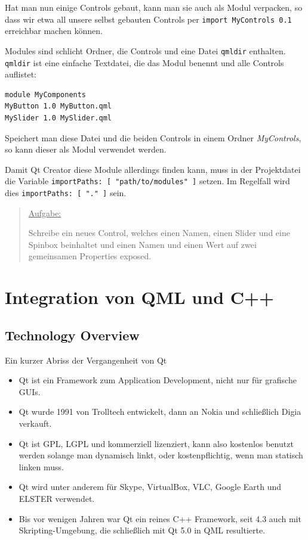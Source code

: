 \documentclass[a4paper]{article}
\begin{document}
Hat man nun einige Controls gebaut, kann man sie auch als Modul verpacken, so dass wir etwa all unsere selbst gebauten Controls per \verb~import MyControls 0.1~ erreichbar machen können.

Modules sind schlicht Ordner, die Controls und eine Datei \verb~qmldir~ enthalten. \verb~qmldir~ ist eine einfache Textdatei, die das Modul benennt und alle Controls auflistet:

\begin{verbatim}
module MyComponents
MyButton 1.0 MyButton.qml
MySlider 1.0 MySlider.qml
\end{verbatim}

Speichert man diese Datei und die beiden Controls in einem Ordner \emph{MyControls}, so kann dieser als Modul verwendet werden.

Damit Qt Creator diese Module allerdings finden kann, muss in der Projektdatei die Variable \verb~importPaths: [ "path/to/modules" ]~ setzen. Im Regelfall wird dies \verb~importPaths: [ "." ]~ sein.

\begin{quote}
\uline{Aufgabe:}

Schreibe ein neues Control, welches einen Namen, einen Slider und eine Spinbox beinhaltet und einen Namen und einen Wert auf zwei gemeinsamen Properties exposed.
\end{quote}
\section{Integration von QML und C++}
\label{sec-2}
\subsection{Technology Overview}
\label{sec-2-1}
Ein kurzer Abriss der Vergangenheit von Qt
\begin{itemize}
\item Qt ist ein Framework zum Application Development, nicht nur für grafische GUIs.
\item Qt wurde 1991 von Trolltech entwickelt, dann an Nokia und schließlich Digia verkauft.
\item Qt ist GPL, LGPL und kommerziell lizenziert, kann also kostenlos benutzt werden solange man dynamisch linkt, oder kostenpflichtig, wenn man statisch linken muss.
\item Qt wird unter anderem für Skype, VirtualBox, VLC, Google Earth und ELSTER verwendet.
\item Bis vor wenigen Jahren war Qt ein reines C++ Framework, seit 4.3 auch mit Skripting-Umgebung, die schließlich mit Qt 5.0 in QML resultierte.
\end{itemize}
\end{document}
